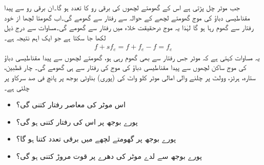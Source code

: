 جب موٹر چل پڑتی ہے اس کے گھومتے لچھوں کی  برقی رو کا تعدد  ہو گا۔ان برقی رو سے پیدا مقناطیسی دباؤ کی موج گھومتے لچھے کے حوالہ سے  رفتار سے گھومے گی۔اب گھومتا لچھا از خود  رفتار   سے گھوم رہا ہو گا لہٰذا یہ موج درحقیقت خلاء میں  رفتار سے گھومے گی۔مساوات   سے درج ذیل لکھا جا سکتا ہے جو ایک اہم نتیجہ ہے۔
\begin{align}
f+s f_e=f +f_e-f=f_e
\end{align} 
 یہ مساوات کہتی ہے کہ موٹر جس رفتار سے بھی گھوم رہی ہو، گھومتے لچھوں سے پیدا مقناطیسی دباؤ کی موج ساکن لچھوں سے پیدا مقناطیسی دباؤ کی موج کی رفتار سے ہی گھومے گی۔
%
 چار قطبین، ستارہ،  ہرٹز،  وولٹ  پر چلنے والی امالی موٹر  کلو واٹ کی (پوری) بناوٹی بوجھ پر پانچ فی صد سرکاو پر چلتی ہے۔
\begin{itemize}
\item
اس موٹر کی معاصر رفتار کتنی گی؟
\item
پورے بوجھ پر اس کی رفتار کتنی ہو گی؟
\item
پورے بوجھ پر گھومتے لچھے میں برقی تعدد کتنا ہو گا؟
\item
پورے بوجھ سے لدے موٹر کی دھرے پر قوت مروڑ کتنی ہو گی؟
\end{itemize}

